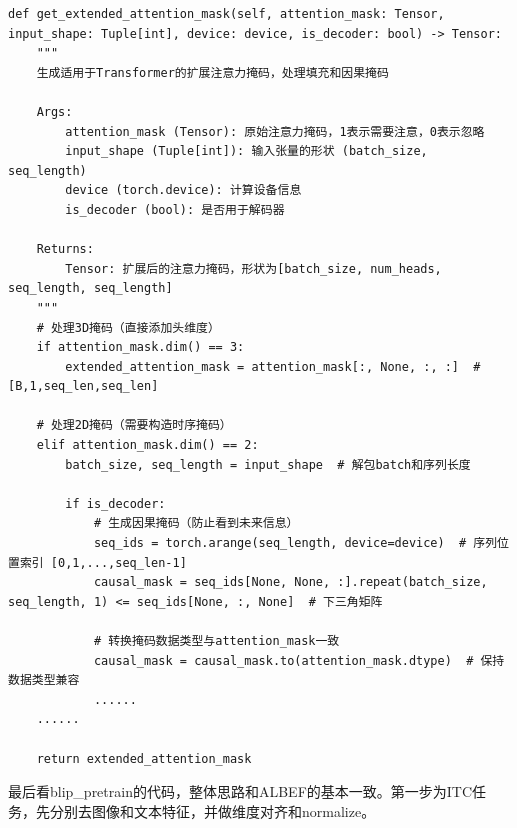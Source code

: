 \documentclass[zihao=false,fontset=windows]{ctexart}
\begin{document}
\begin{feishucode}
\begin{lstlisting}
def get_extended_attention_mask(self, attention_mask: Tensor, input_shape: Tuple[int], device: device, is_decoder: bool) -> Tensor:
    """
    生成适用于Transformer的扩展注意力掩码，处理填充和因果掩码
    
    Args:
        attention_mask (Tensor): 原始注意力掩码，1表示需要注意，0表示忽略
        input_shape (Tuple[int]): 输入张量的形状 (batch_size, seq_length)
        device (torch.device): 计算设备信息
        is_decoder (bool): 是否用于解码器
    
    Returns:
        Tensor: 扩展后的注意力掩码，形状为[batch_size, num_heads, seq_length, seq_length]
    """
    # 处理3D掩码（直接添加头维度）
    if attention_mask.dim() == 3:
        extended_attention_mask = attention_mask[:, None, :, :]  # [B,1,seq_len,seq_len]
    
    # 处理2D掩码（需要构造时序掩码）
    elif attention_mask.dim() == 2:
        batch_size, seq_length = input_shape  # 解包batch和序列长度

        if is_decoder:
            # 生成因果掩码（防止看到未来信息）
            seq_ids = torch.arange(seq_length, device=device)  # 序列位置索引 [0,1,...,seq_len-1]
            causal_mask = seq_ids[None, None, :].repeat(batch_size, seq_length, 1) <= seq_ids[None, :, None]  # 下三角矩阵
            
            # 转换掩码数据类型与attention_mask一致
            causal_mask = causal_mask.to(attention_mask.dtype)  # 保持数据类型兼容
            ......
    ......
    
    return extended_attention_mask
\end{lstlisting}
\end{feishucode}
最后看blip\_pretrain的代码，整体思路和ALBEF的基本一致。第一步为ITC任务，先分别去图像和文本特征，并做维度对齐和normalize。\par
\end{document}
